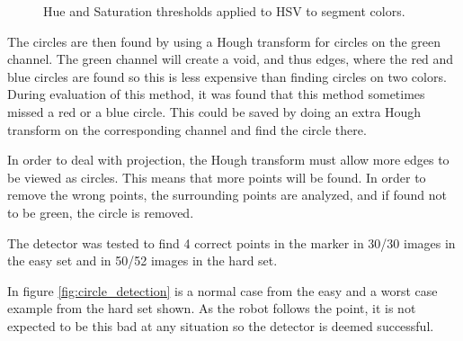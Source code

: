 \begin{figure}
\caption{Hue and Saturation thresholds applied to HSV to segment colors.}
\label{fig:hsv_color_segmentation}
\end{figure}

The circles are then found by using a Hough transform for circles on the green channel.
The green channel will create a void, and thus edges, where the red and blue circles are found so this is less expensive than finding circles on two colors.
During evaluation of this method, it was found that this method sometimes missed a red or a blue circle.
This could be saved by doing an extra Hough transform on the corresponding channel and find the circle there.

In order to deal with projection, the Hough transform must allow more edges to be viewed as circles.
This means that more points will be found.
In order to remove the wrong points, the surrounding points are analyzed, and if found not to be green, the circle is removed.

The detector was tested to find 4 correct points in the marker in 30/30 images in the easy set and in 50/52 images in the hard set.

In figure \ref{fig:circle_detection} is a normal case from the easy and a worst case example from the hard set shown.
As the robot follows the point, it is not expected to be this bad at any situation so the detector is deemed successful.

